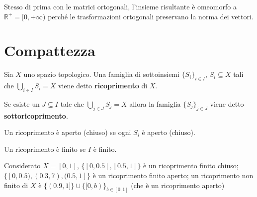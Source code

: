 \begin{example}
    Stesso di prima con le matrici ortogonali, l'insieme risultante è omeomorfo
    a \(\mathbb{R}^{+} = [0, +\infty)\) perché le trasformazioni ortogonali preservano la
    norma dei vettori. 
\end{example}



\section{Compattezza}
\begin{definition}
    Sia \(X\) uno spazio topologico. Una famiglia di sottoinsiemi
    \(\{S_{i}\}_{i \in  I}, \, S_{i} \subseteq X\) tali che \(\bigcup_{i \in  I} S_{i} = X\) viene
    detto \textbf{ricoprimento} di \(X\).

    Se esiste un \(J \subseteq I\) tale che
    \(
        \bigcup_{j \in J} S_{j} = X
        \) allora la famiglia \(\{S_{j}\}_{j \in J}\) viene detto
        \textbf{sottoricoprimento}.

        Un ricoprimento è aperto (chiuso) se ogni \(S_{i}\) è
        aperto (chiuso).

        Un ricoprimento è finito se \(I\) è finito.
\end{definition}
\begin{example}
    Considerato \(X = [0, 1]\), \(\{[0, 0.5], [0.5, 1]\} \) è un ricoprimento
    finito chiuso; \(\{[0, 0.5), (0.3, 7), (0.5, 1]\} \) è un ricoprimento finito
    aperto; un ricoprimento non finito di \(X\) è
    \(\{(0.9, 1]\} \cup \{[0, b)\}_{b \in [0, 1]}\) (che è un ricoprimento aperto)
\end{example}

